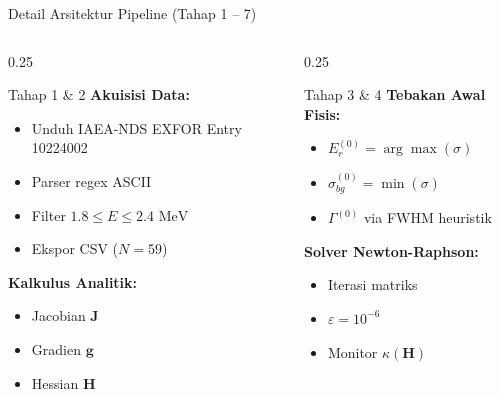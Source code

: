 \documentclass[aspectratio=169, 10pt]{beamer}
\begin{document}
\begin{frame}{Detail Arsitektur Pipeline (Tahap 1 -- 7)}
	\begin{columns}[T]
		\begin{column}{0.25\textwidth}
			\begin{block}{Tahap 1 \& 2}
				\scriptsize
				\textbf{Akuisisi Data:}
				\begin{itemize}
					\item Unduh IAEA-NDS EXFOR Entry 10224002
					\item Parser regex ASCII
					\item Filter $1.8 \le E \le 2.4\text{ MeV}$
					\item Ekspor CSV ($N=59$)
				\end{itemize}
				\textbf{Kalkulus Analitik:}
				\begin{itemize}
					\item Jacobian $\mathbf{J}$
					\item Gradien $\mathbf{g}$
					\item Hessian $\mathbf{H}$
				\end{itemize}
			\end{block}
		\end{column}

		\begin{column}{0.25\textwidth}
			\begin{block}{Tahap 3 \& 4}
				\scriptsize
				\textbf{Tebakan Awal Fisis:}
				\begin{itemize}
					\item $E_r^{(0)} = \arg\max(\sigma)$
					\item $\sigma_{bg}^{(0)} = \min(\sigma)$
					\item $\Gamma^{(0)}$ via FWHM heuristik
				\end{itemize}
				\textbf{Solver Newton-Raphson:}
				\begin{itemize}
					\item Iterasi matriks
					\item $\varepsilon = 10^{-6}$
					\item Monitor $\kappa(\mathbf{H})$
				\end{itemize}
			\end{block}
		\end{column}


\end{columns}
\end{frame}
\end{document}
